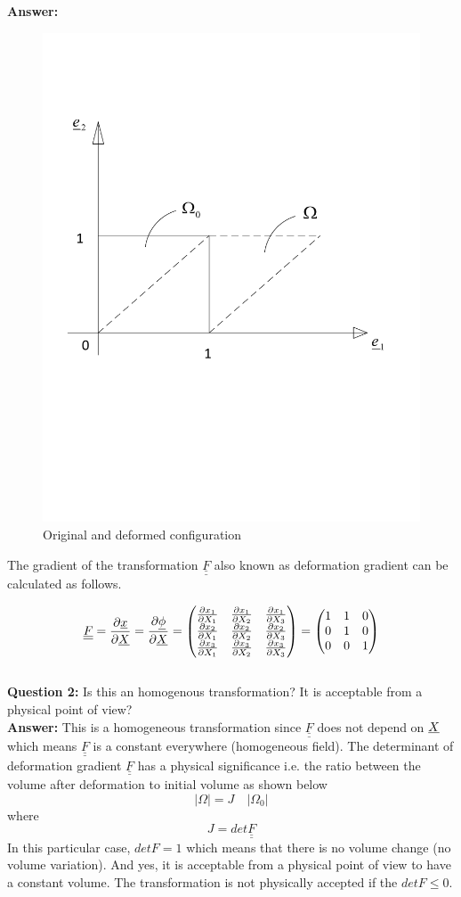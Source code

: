 \documentclass[letter,12pt]{article}
\newcommand{\TT}[1]{\underline{\underline{#1}}}
\begin{document}
	\textbf{Answer:} 
	\begin{figure}[ht]
		\centering
		\includegraphics[width=0.5\linewidth]{figures/TRANSFORM}
		\caption{Original and deformed configuration}
		\label{fig:uniaxial}
	\end{figure}
	
	The gradient of the transformation $\TT{F}$ also known as deformation gradient can be calculated as follows.
	
	\begin{equation}
      \TT{F} = \derp{\xu}{\Xu} = \derp{\phiu}{\Xu} = \left( \begin{matrix}
      \derp{x_1}{X_1}  & \derp{x_1}{X_2} & \derp{x_1}{X_3} \\
      \derp{x_2}{X_1} & \derp{x_2}{X_2} & \derp{x_2}{X_3} \\
      \derp{x_3}{X_1} & \derp{x_3}{X_2} & \derp{x_3}{X_3} 
      \end{matrix} \right)=
      \left(
      \begin{matrix}
      1 & 1 & 0 \\
      0 & 1 & 0 \\
      0 & 0 & 1
      \end{matrix}
      \right)
	\end{equation} \\
	
	\noindent \textbf{Question 2:} Is this an homogenous transformation? It is acceptable from a physical point of view? \\
	
	\textbf{Answer:} This is a homogeneous transformation since $\TT{F}$ does not depend on $\underline{X}$ which means $\TT{F}$ is a constant everywhere (homogeneous field). The determinant of deformation gradient $\TT{F}$ has a physical significance i.e. the ratio between the volume after deformation to initial volume as shown below
	\begin{equation}
	|\Omega| = J \quad |\Omega_0|
	\end{equation}
	where 
	\begin{equation}
	J = det \TT{F}
	\end{equation}
	In this particular case, $det F = 1$ which means that there is no volume change (no volume variation). And yes, it is acceptable from a physical point of view to have a constant volume. The transformation is not physically accepted if the $det F \leq 0$. \\
\end{document}

